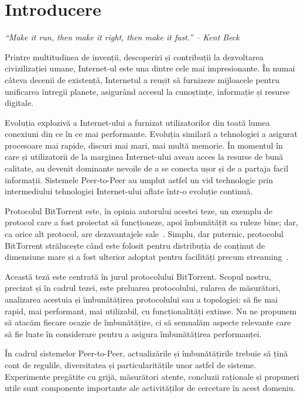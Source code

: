 
\chapter{Introducere}
\label{chapter:intro}

\textit{``Make it run, then make it right, then make it fast.'' -- Kent Beck}

Printre multitudinea de invenții, descoperiri și contribuții la dezvoltarea
civizilizației umane, Internet-ul este una dintre cele mai impresionante. În
numai câteva decenii de existență, Internetul a reușit să furnizeze mijloacele
pentru unificarea întregii planete, asigurând accesul la cunoștințe,
informație și resurse digitale.

Evoluția explozivă a Internet-ului a furnizat utilizatorilor din toată lumea
conexiuni din ce în ce mai performante. Evoluția similară a tehnologiei a
asigurat procesoare mai rapide, discuri mai mari, mai multă memorie. În
momentul în care și utilizatorii de la marginea Internet-ului aveau acces la
resurse de bună calitate, au devenit dominante nevoile de a se conecta ușor și
de a partaja facil informații. Sistemele Peer-to-Peer au umplut astfel un vid
technologic prin intermediului tehnologiei Internet-ului aflate într-o
evoluție continuă.

Protocolul BitTorrent este, în opinia autorului acestei teze, un exemplu de
protocol care a fost proiectat să funcționeze, apoi îmbunătățit sa ruleze
bine; dar, ca orice alt protocol, are dezavantajele
sale~\cite{bittorrent-trade-offs}. Simplu, dar puternic, protocolul BitTorrent
strălucește când este folosit pentru distribuția de conținut de dimensiune
mare și a fost ulterior adoptat pentru facilități precum
streaming~\cite{bittorrent-streaming}.

Această teză este centrată în jurul protocolului BitTorrent. Scopul nostru,
precizat și în cadrul tezei, este preluarea protocolului, rularea de
măsurători, analizarea acestuia și îmbunătățirea protocolului sau a topologiei:
să fie mai rapid, mai performant, mai utilizabil, cu funcționalități extinse.
Nu ne propunem să atacăm fiecare ocazie de îmbunătățire, ci să semnalăm
aspecte relevante care să fie luate în considerare pentru a asigura
îmbunătățirea performanței.

În cadrul sistemelor Peer-to-Peer, actualizările și îmbunătățirile trebuie să
țină cont de regulile, diversitatea și particularitățile unor astfel de
sisteme. Experimente pregătite cu grijă, măsurători atente, concluzii
raționale și propuneri utile sunt componente importante ale activităților de
cercetare în acest domeniu.

